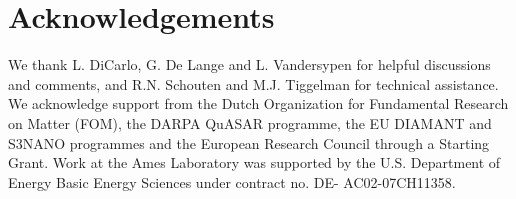 \section{Acknowledgements}
We thank L. DiCarlo, G. De Lange and L. Vandersypen for helpful discussions and comments, and R.N. Schouten and M.J. Tiggelman for technical assistance. We acknowledge support from the Dutch Organization for Fundamental Research on Matter (FOM), the DARPA QuASAR programme, the EU DIAMANT and S3NANO programmes and the European Research Council through a Starting Grant. Work at the Ames Laboratory was supported by the U.S. Department of Energy Basic Energy Sciences under contract no. DE- AC02-07CH11358.

\newpage





